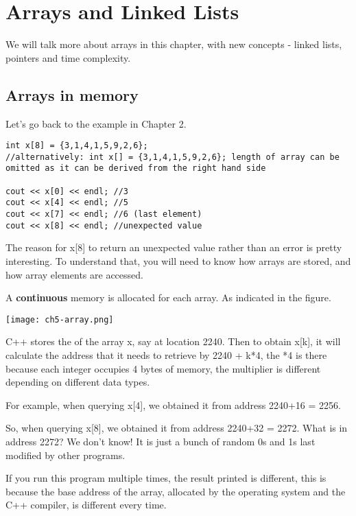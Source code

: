 \chapter{Arrays and Linked Lists}

We will talk more about arrays in this chapter, with new concepts - linked lists, pointers and time complexity.

\section{Arrays in memory}

Let's go back to the example in Chapter 2.

\begin{lstlisting}
int x[8] = {3,1,4,1,5,9,2,6};
//alternatively: int x[] = {3,1,4,1,5,9,2,6}; length of array can be omitted as it can be derived from the right hand side

cout << x[0] << endl; //3 
cout << x[4] << endl; //5
cout << x[7] << endl; //6 (last element)
cout << x[8] << endl; //unexpected value 
\end{lstlisting}

The reason for x[8] to return an unexpected value rather than an error is pretty interesting. To understand that, you will need to know how arrays are stored, and how array elements are accessed. 

A \textbf{continuous} memory is allocated for each array. As indicated in the figure.

\texttt{[image: ch5-array.png]}

C++ stores the \textbf{} of the array x, say at location 2240. Then to obtain x[k], it will calculate the address that it needs to retrieve by 2240 + k*4, the *4 is there because each integer occupies 4 bytes of memory, the multiplier is different depending on different data types. 

For example, when querying x[4], we obtained it from address 2240+16 = 2256. 

So, when querying x[8], we obtained it from address 2240+32 = 2272. What is in address 2272? We don't know! It is just a bunch of random 0s and 1s last modified by other programs. 
\vspace{6mm}

If you run this program multiple times, the result printed is different, this is because the base address of the array, allocated by the operating system and the C++ compiler, is different every time. 

